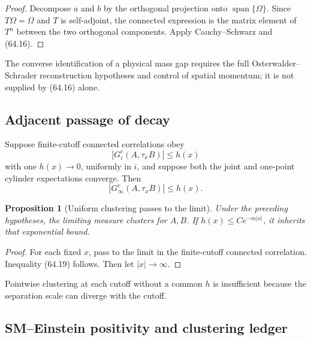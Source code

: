 \documentclass[11pt]{article}
\newtheorem{proposition}[theorem]{Proposition}
\begin{document}
\begin{proof}
Decompose \(a\) and \(b\) by the orthogonal projection onto
\(\operatorname{span}\{\Omega\}\).  Since \(T\Omega=\Omega\) and \(T\)
is self-adjoint, the connected expression is the matrix element of
\(T^n\) between the two orthogonal components.  Apply Cauchy--Schwarz
and (64.16).
\end{proof}

The converse identification of a physical mass gap requires the full
Osterwalder--Schrader reconstruction hypotheses and control of spatial
momentum; it is not supplied by (64.16) alone.

\subsection{Adjacent passage of decay}

Suppose finite-cutoff connected correlations obey
\[
                      |G_i^c(A,\tau_xB)|\le h(x)              \tag{64.18}
\]
with one \(h(x)\to0\), uniformly in \(i\), and suppose both the joint
and one-point cylinder expectations converge.  Then
\[
                      |G_\infty^c(A,\tau_xB)|\le h(x).        \tag{64.19}
\]

\begin{proposition}[Uniform clustering passes to the limit]
\label{prop:v11v64-passage}
Under the preceding hypotheses, the limiting measure clusters for
\(A,B\).  If \(h(x)\le Ce^{-m|x|}\), it inherits that exponential
bound.
\end{proposition}

\begin{proof}
For each fixed \(x\), pass to the limit in the finite-cutoff connected
correlation.  Inequality (64.19) follows.  Then let \(|x|\to\infty\).
\end{proof}

Pointwise clustering at each cutoff without a common \(h\) is
insufficient because the separation scale can diverge with the cutoff.

\subsection{SM--Einstein positivity and clustering ledger}
\end{document}
